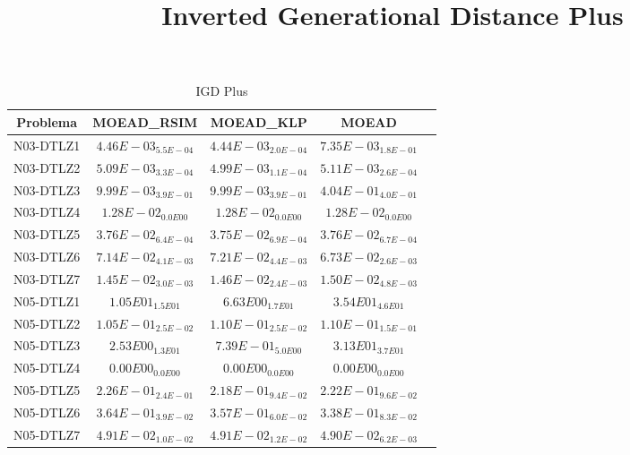 \documentclass{article}
\title{Inverted Generational Distance Plus}
\author{}
\begin{document}
\maketitle
\begin{table*}[ht!]
\scriptsize
\caption{IGD Plus}
\centering\begin{tabular}{|c||c||c||c||c|} \hline
Problema &MOEAD_RSIM &MOEAD_KLP &MOEAD\\\hline
N03-DTLZ1 &\cellcolor{gray25}$4.46E-03_{5.5E-04}$ &\cellcolor{gray95}$4.44E-03_{2.0E-04}$ &$7.35E-03_{1.8E-01}$\\ 
\hline
N03-DTLZ2 &\cellcolor{gray25}$5.09E-03_{3.3E-04}$ &\cellcolor{gray95}$4.99E-03_{1.1E-04}$ &$5.11E-03_{2.6E-04}$\\ 
\hline
N03-DTLZ3 &\cellcolor{gray95}$9.99E-03_{3.9E-01}$ &\cellcolor{gray25}$9.99E-03_{3.9E-01}$ &$4.04E-01_{4.0E-01}$\\ 
\hline
N03-DTLZ4 &\cellcolor{gray95}$1.28E-02_{0.0E00}$ &\cellcolor{gray25}$1.28E-02_{0.0E00}$ &$1.28E-02_{0.0E00}$\\ 
\hline
N03-DTLZ5 &$3.76E-02_{6.4E-04}$ &\cellcolor{gray95}$3.75E-02_{6.9E-04}$ &\cellcolor{gray25}$3.76E-02_{6.7E-04}$\\ 
\hline
N03-DTLZ6 &\cellcolor{gray25}$7.14E-02_{4.1E-03}$ &$7.21E-02_{4.4E-03}$ &\cellcolor{gray95}$6.73E-02_{2.6E-03}$\\ 
\hline
N03-DTLZ7 &\cellcolor{gray95}$1.45E-02_{3.0E-03}$ &\cellcolor{gray25}$1.46E-02_{2.4E-03}$ &$1.50E-02_{4.8E-03}$\\ 
\hline
N05-DTLZ1 &\cellcolor{gray25}$1.05E01_{1.5E01}$ &\cellcolor{gray95}$6.63E00_{1.7E01}$ &$3.54E01_{4.6E01}$\\ 
\hline
N05-DTLZ2 &\cellcolor{gray95}$1.05E-01_{2.5E-02}$ &\cellcolor{gray25}$1.10E-01_{2.5E-02}$ &$1.10E-01_{1.5E-01}$\\ 
\hline
N05-DTLZ3 &\cellcolor{gray25}$2.53E00_{1.3E01}$ &\cellcolor{gray95}$7.39E-01_{5.0E00}$ &$3.13E01_{3.7E01}$\\ 
\hline
N05-DTLZ4 &\cellcolor{gray95}$0.00E00_{0.0E00}$ &\cellcolor{gray25}$0.00E00_{0.0E00}$ &$0.00E00_{0.0E00}$\\ 
\hline
N05-DTLZ5 &$2.26E-01_{2.4E-01}$ &\cellcolor{gray95}$2.18E-01_{9.4E-02}$ &\cellcolor{gray25}$2.22E-01_{9.6E-02}$\\ 
\hline
N05-DTLZ6 &$3.64E-01_{3.9E-02}$ &\cellcolor{gray25}$3.57E-01_{6.0E-02}$ &\cellcolor{gray95}$3.38E-01_{8.3E-02}$\\ 
\hline
N05-DTLZ7 &$4.91E-02_{1.0E-02}$ &\cellcolor{gray25}$4.91E-02_{1.2E-02}$ &\cellcolor{gray95}$4.90E-02_{6.2E-03}$\\ 

\end{tabular}
\end{table*}
\end{document}
